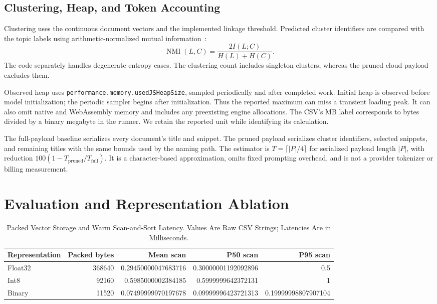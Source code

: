 \documentclass[conference]{IEEEtran}
\newcommand{\mFloatBytes}{368640}
\newcommand{\mFloatScanMean}{0.29450000047683716}
\newcommand{\mFloatScanMedian}{0.30000001192092896}
\newcommand{\mFloatScanTail}{0.5}
\newcommand{\mIntBytes}{92160}
\newcommand{\mIntScanMean}{0.5985000002384185}
\newcommand{\mIntScanMedian}{0.5999999642372131}
\newcommand{\mIntScanTail}{1}
\newcommand{\mBinaryBytes}{11520}
\newcommand{\mBinaryScanMean}{0.07499999970197678}
\newcommand{\mBinaryScanMedian}{0.09999996423721313}
\newcommand{\mBinaryScanTail}{0.19999998807907104}
\begin{document}
\subsection{Clustering, Heap, and Token Accounting}
Clustering uses the continuous document vectors and the implemented linkage
threshold. Predicted cluster identifiers are compared with the topic labels
using arithmetic-normalized mutual information~\cite{vinh2010nmi}:
\begin{equation}
 \operatorname{NMI}(L,C)=
 \frac{2I(L;C)}{H(L)+H(C)}.
 \label{eq:nmi}
\end{equation}
The code separately handles degenerate entropy cases. The clustering count
includes singleton clusters, whereas the pruned cloud payload excludes them.

Observed heap uses \texttt{performance.memory.usedJSHeapSize}, sampled
periodically and after completed work. Initial heap is observed before model
initialization; the periodic sampler begins after initialization. Thus the
reported maximum can miss a transient loading peak. It can also omit native
and WebAssembly memory and includes any preexisting engine allocations.
The CSV's MB label corresponds to bytes divided by a binary megabyte in the
runner. We retain the reported unit while identifying its calculation.

The full-payload baseline serializes every document's title and snippet.
The pruned payload serializes cluster identifiers, selected snippets, and
remaining titles with the same bounds used by the naming path. The estimator
is $T=\lceil |P|/4\rceil$ for serialized payload length $|P|$, with reduction
$100(1-T_{\mathrm{pruned}}/T_{\mathrm{full}})$. It is a character-based
approximation, omits fixed prompting overhead, and is not a provider tokenizer
or billing measurement.

\section{Evaluation and Representation Ablation}
\begin{table}[!t]
\caption{Packed Vector Storage and Warm Scan-and-Sort Latency. Values Are Raw CSV Strings; Latencies Are in Milliseconds.}
\label{tab:scans}
\centering
\small
\setlength{\tabcolsep}{6pt}
\begin{tabular}{lrrrr}
\toprule
Representation & Packed bytes & Mean scan & P50 scan & P95 scan\\
\midrule
Float32 & \mFloatBytes & \mFloatScanMean & \mFloatScanMedian & \mFloatScanTail\\
Int8 & \mIntBytes & \mIntScanMean & \mIntScanMedian & \mIntScanTail\\
Binary & \mBinaryBytes & \mBinaryScanMean & \mBinaryScanMedian & \mBinaryScanTail\\
\bottomrule
\end{tabular}
\end{table}
\end{document}
